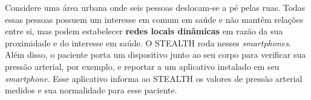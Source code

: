 \documentclass[12pt]{article}
\newcommand{\agn}[1]{\textcolor{auburn}{#1}}
\begin{document}
Considere uma área urbana onde seis pessoas deslocam-se a pé pelas ruas.
Todas essas pessoas possuem um interesse em comum em saúde e não mantêm relações entre si, mas podem estabelecer {\bf redes locais dinâmicas} em razão da sua proximidade e do interesse em saúde. %
O \mbox{STEALTH} roda nesses \textit{smartphones}. Além disso, o paciente porta um dispositivo junto ao seu corpo para verificar sua pressão arterial, por exemplo, e reportar a um aplicativo instalado em seu \textit{smartphone}. Esse aplicativo
informa ao \mbox{STEALTH}
os valores de pressão arterial medidos e sua normalidade para esse paciente.
\end{document}
